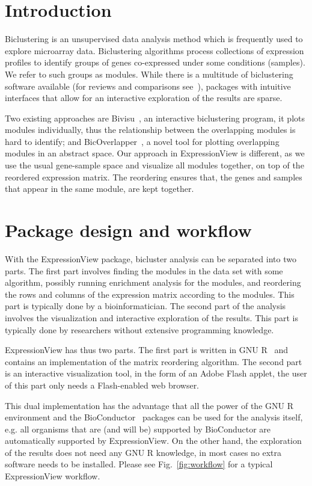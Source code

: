 \documentclass[round]{bioinfo}
\begin{document}
\vspace*{-9pt}
\section{Introduction}
Biclustering is an unsupervised data analysis method which is
frequently used to explore microarray data. Biclustering algorithms
process collections of expression profiles to identify groups of genes
co-expressed under some conditions (samples). We refer to such groups
as modules. While there is a multitude of biclustering software
available (for reviews  and comparisons
see~\cite{madeira04,ihmels04,prelic06}), packages with intuitive
interfaces that allow for an interactive exploration of the results
are sparse. 

Two existing approaches are Bivisu~\citep{cheng07}, an interactive
biclustering program, it plots modules individually, thus the
relationship between the overlapping modules is hard to identify; and
BicOverlapper~\citep{santamaria08}, a novel tool for plotting
overlapping modules in an abstract space. Our approach in
ExpressionView is different, as we use the usual gene-sample
space and visualize all modules together, on top of the reordered
expression matrix. The reordering ensures that, the genes and samples
that appear in the same module, are kept together.

\vspace*{-9pt}
\section{Package design and workflow}
With the ExpressionView package, bicluster analysis can be separated
into two parts. The first part involves finding the
modules in the data set with some algorithm, possibly running
enrichment analysis for the modules, and reordering the rows and
columns of the expression matrix according to the modules. This
part is typically done by a bioinformatician. The second part of the
analysis involves the visualization and interactive exploration of the
results. This part is typically done by researchers without extensive
programming knowledge.

ExpressionView has thus two parts. The first part is written in GNU
R~\citep{R} and contains an implementation of the matrix reordering
algorithm. The second part is an interactive visualization tool, in
the form of an Adobe Flash applet, the user of this part only needs a
Flash-enabled web browser.

This dual implementation has the advantage that all the power of the
GNU R environment and the BioConductor~\citep{gentleman04} packages
can be used for the analysis itself, e.g. all organisms that are (and
will be) supported by BioConductor are automatically supported by
ExpressionView. On the other hand, the exploration of the results does
not need any GNU R knowledge, in most cases no extra software needs to
be installed. Please see Fig.~\ref{fig:workflow} for a typical
ExpressionView workflow.
\end{document}
